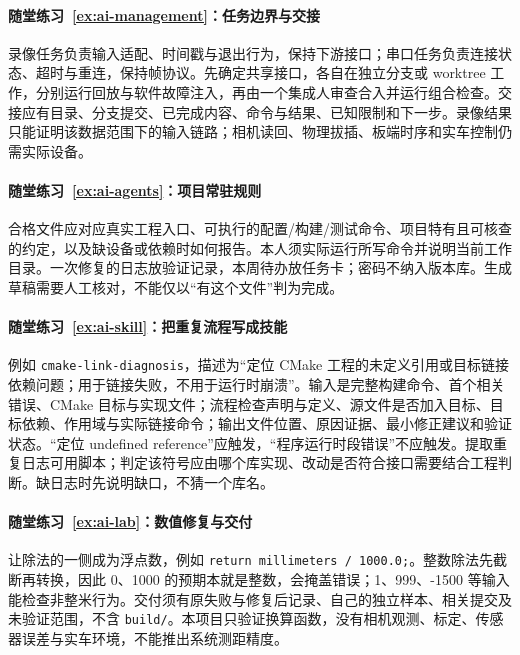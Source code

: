 \paragraph*{随堂练习~\ref{ex:ai-management}：任务边界与交接}
\begin{solution}
录像任务负责输入适配、时间戳与退出行为，保持下游接口；串口任务负责连接状态、超时与重连，保持帧协议。先确定共享接口，各自在独立分支或 worktree 工作，分别运行回放与软件故障注入，再由一个集成人审查合入并运行组合检查。交接应有目录、分支提交、已完成内容、命令与结果、已知限制和下一步。录像结果只能证明该数据范围下的输入链路；相机读回、物理拔插、板端时序和实车控制仍需实际设备。
\end{solution}

\paragraph*{随堂练习~\ref{ex:ai-agents}：项目常驻规则}
\begin{solution}
合格文件应对应真实工程入口、可执行的配置/构建/测试命令、项目特有且可核查的约定，以及缺设备或依赖时如何报告。本人须实际运行所写命令并说明当前工作目录。一次修复的日志放验证记录，本周待办放任务卡；密码不纳入版本库。生成草稿需要人工核对，不能仅以“有这个文件”判为完成。
\end{solution}

\paragraph*{随堂练习~\ref{ex:ai-skill}：把重复流程写成技能}
\begin{solution}
例如 \texttt{cmake-link-diagnosis}，描述为“定位 CMake 工程的未定义引用或目标链接依赖问题；用于链接失败，不用于运行时崩溃”。输入是完整构建命令、首个相关错误、CMake 目标与实现文件；流程检查声明与定义、源文件是否加入目标、目标依赖、作用域与实际链接命令；输出文件位置、原因证据、最小修正建议和验证状态。“定位 undefined reference”应触发，“程序运行时段错误”不应触发。提取重复日志可用脚本；判定该符号应由哪个库实现、改动是否符合接口需要结合工程判断。缺日志时先说明缺口，不猜一个库名。
\end{solution}

\paragraph*{随堂练习~\ref{ex:ai-lab}：数值修复与交付}
\begin{solution}
让除法的一侧成为浮点数，例如 \texttt{return millimeters / 1000.0;}。整数除法先截断再转换，因此 0、1000 的预期本就是整数，会掩盖错误；1、999、-1500 等输入能检查非整米行为。交付须有原失败与修复后记录、自己的独立样本、相关提交及未验证范围，不含 \texttt{build/}。本项目只验证换算函数，没有相机观测、标定、传感器误差与实车环境，不能推出系统测距精度。
\end{solution}

